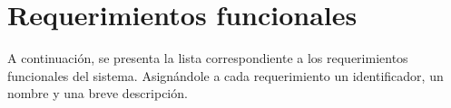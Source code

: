 \section{Requerimientos funcionales}


A continuación, se presenta la lista correspondiente a los requerimientos funcionales del sistema. Asignándole a cada requerimiento un identificador, un nombre y una breve descripción.
